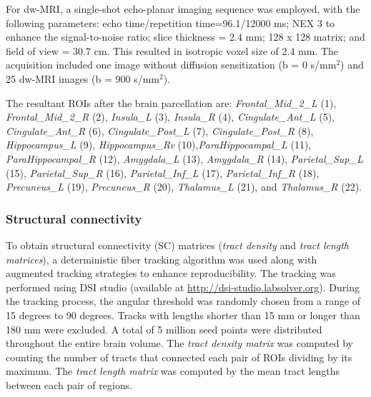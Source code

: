 \documentclass[../main.tex]{subfiles}
\begin{document}
For dw-MRI, a single-shot echo-planar imaging sequence was employed, with the following parameters: echo time/repetition time=96.1/12000 ms; NEX 3 to enhance the signal-to-noise ratio; slice thickness = 2.4 mm; 128 x 128 matrix; and field of view = $30.7$ cm. This resulted in isotropic voxel size of 2.4 mm.
The acquisition included one image without diffusion sensitization (b = 0 s/mm$^2$) and 25 dw-MRI images (b = 900 s/mm$^2$).

The resultant ROIs after the brain parcellation are:
\textit{Frontal\_Mid\_2\_L} (1), \textit{Frontal\_Mid\_2\_R} (2), \textit{Insula\_L} (3), \textit{Insula\_R} (4), \textit{Cingulate\_Ant\_L} (5), \textit{Cingulate\_Ant\_R} (6), \textit{Cingulate\_Post\_L} (7), \textit{Cingulate\_Post\_R} (8), \textit{Hippocampus\_L} (9), \textit{Hippocampus\_Rv} (10),\textit{ParaHippocampal\_L} (11), \textit{ParaHippocampal\_R} (12), \textit{Amygdala\_L} (13), \textit{Amygdala\_R} (14), \textit{Parietal\_Sup\_L} (15), 
    \textit{Parietal\_Sup\_R} (16), \textit{Parietal\_Inf\_L} (17), 
    \textit{Parietal\_Inf\_R} (18), \textit{Precuneus\_L} (19), \textit{Precuneus\_R} (20), \textit{Thalamus\_L} (21), and \textit{Thalamus\_R} (22).
\subsubsection{Structural connectivity}
To obtain structural connectivity (SC) matrices (\textit{tract density} and \textit{tract length matrices}), a deterministic fiber tracking algorithm  was used \citep{yeh2013deterministic} along with augmented tracking strategies \citep{yeh2020shape} to enhance reproducibility.
The tracking was performed using DSI studio (available at \url{http://dsi-studio.labsolver.org}).
During the tracking process, the angular threshold was randomly chosen from a range of 15 degrees to 90 degrees.
Tracks with lengths shorter than 15 mm or longer than 180 mm were excluded.
A total of 5 million seed points were distributed throughout the entire brain volume.
The \textit{tract density matrix} was computed by counting the number of tracts that connected each pair of ROIs dividing by its maximum.
The \textit{tract length matrix} was computed by the mean tract lengths between each pair of regions.
\clearpage
\end{document}
